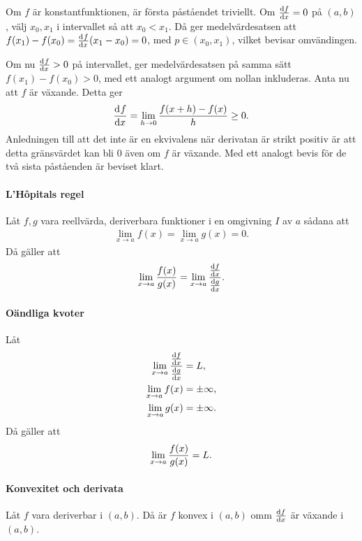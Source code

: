 \proof
Om $f$ är konstantfunktionen, är första påståendet triviellt. Om $\dv{f}{x}(x) = 0$ på $(a, b)$, välj $x_0, x_1$ i intervallet så att $x_0 < x_1$. Då ger medelvärdesatsen att $f(x_1) - f(x_0) = \dv[]{f}{x} (x)(x_1 - x_0) = 0$, med $p\in (x_0, x_1)$, vilket bevisar omvändingen.

Om nu $\dv[]{f}{x} (x) > 0$ på intervallet, ger medelvärdesatsen på samma sätt $f(x_1) - f(x_0) > 0$, med ett analogt argument om nollan inkluderas. Anta nu att $f$ är växande. Detta ger
\begin{align*}
	\dv[]{f}{x} (x) = \lim\limits_{h\to 0}\frac{f(x + h) - f(x)}{h}\geq 0.
\end{align*}
Anledningen till att det inte är en ekvivalens när derivatan är strikt positiv är att detta gränsvärdet kan bli $0$ även om $f$ är växande. Med ett analogt bevis för de två sista påståenden är beviset klart.

\paragraph{L'Hôpitals regel}
Låt $f, g$ vara reellvärda, deriverbara funktioner i en omgivning $I$ av $a$ sådana att
\begin{align*}
	\lim\limits_{x\to a}f(x) = \lim\limits_{x\to a}g(x) = 0.
\end{align*}
Då gäller att
\begin{align*}
	\lim\limits_{x\to a}\frac{f(x)}{g(x)} = \lim\limits_{x\to a}\frac{\dv{f}{x} (x)}{\dv{g}{x} (x)}.
\end{align*}

\proof

\paragraph{Oändliga kvoter}
Låt
\begin{align*}
	\lim\limits_{x\to a}\frac{\dv{f}{x} (x)}{\dv{g}{x} (x)} &= L, \\
	\lim\limits_{x\to a}f(x)                                        &= \pm\infty, \\
	\lim\limits_{x\to a}g(x)                                        &= \pm\infty.
\end{align*}
Då gäller att
\begin{align*}
	\lim\limits_{x\to a}\frac{f(x)}{g(x)} = L.
\end{align*}

\proof

\paragraph{Konvexitet och derivata}
Låt $f$ vara deriverbar i $(a, b)$. Då är $f$ konvex i $(a, b)$ omm $\dv{f}{x}$ är växande i $(a, b)$.

